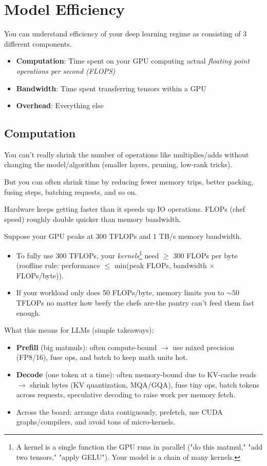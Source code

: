\chapter{Model Efficiency}

You can understand efficiency of your deep learning regime as consisting of 3 different components.
\begin{itemize}
	\item \textbf{Computation}: Time spent on your GPU computing actual \textit{floating point operations per second (FLOPS)} 
	\item \textbf{Bandwidth}: Time spent transferring tensors within a GPU
	\item \textbf{Overhead}: Everything else
\end{itemize}

\section{Computation}

You can't really shrink the number of operations like multiplies/adds without changing the model/algorithm (\eg smaller layers, pruning, low-rank tricks).

But you can often shrink time by reducing fewer memory trips, better packing, fusing steps, batching requests, and so on. 

Hardware keeps getting faster than it speeds up IO operations. FLOPs (chef speed) roughly double quicker than memory bandwidth.

Suppose your GPU peaks at 300 TFLOPs and 1 TB/s memory bandwidth.
\begin{itemize}
	\item To fully use 300 TFLOPs, your \textit{kernels}\footnote{A kernel is a single function the GPU runs in parallel (\eg "do this matmul," "add two tensors," "apply GELU"). Your model is a chain of many kernels.} need $\geq$ 300 FLOPs per byte (roofline rule: performance $\leq$ min(peak FLOPs, bandwidth $\times$ FLOPs/byte)).
	\item If your workload only does 50 FLOPs/byte, memory limits you to $\sim 50$ TFLOPs no matter how beefy the chefs are-the pantry can't feed them fast enough.
\end{itemize}


What this means for LLMs (simple takeaways):
\begin{itemize}
	\item \textbf{Prefill} (big matmuls): often compute-bound $\to$ use mixed precision (FP8/16), fuse ops, and batch to keep math units hot.
	\item \textbf{Decode} (one token at a time): often memory-bound due to KV-cache reads $\to$ shrink bytes (KV quantization, MQA/GQA), fuse tiny ops, batch tokens across requests, speculative decoding to raise work per memory fetch.
	\item Across the board: arrange data contiguously, prefetch, use CUDA graphs/compilers, and avoid tons of micro-kernels.
\end{itemize}


